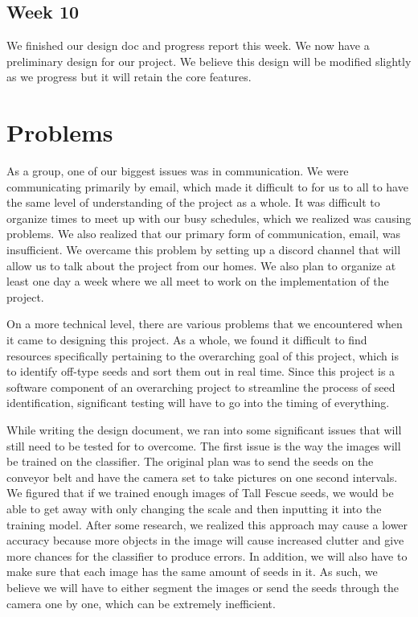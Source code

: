 \documentclass[onecolumn, draftclsnofoot,10pt, compsoc]{IEEEtran}
\begin{document}
	\subsection{Week 10}
	We finished our design doc and progress report this week. We now have a preliminary design for our project. We believe this design will be modified slightly as we progress but it will retain the core features.
	
	\section{Problems}
	
	As a group, one of our biggest issues was in communication. We were communicating primarily by email, which made it difficult to for us to all to have the same level of understanding of the project as a whole. It was difficult to organize times to meet up with our busy schedules, which we realized was causing problems. We also realized that our primary form of communication, email, was insufficient. We overcame this problem by setting up a discord channel that will allow us to talk about the project from our homes. We also plan to organize at least one day a week where we all meet to work on the implementation of the project.
	
	On a more technical level, there are various problems that we encountered when it came to designing this project. As a whole, we found it difficult to find resources specifically pertaining to the overarching goal of this project, which is to identify off-type seeds and sort them out in real time. Since this project is a software component of an overarching project to streamline the process of seed identification, significant testing will have to go into the timing of everything. 
	
	While writing the design document, we ran into some significant issues that will still need to be tested for to overcome. The first issue is the way the images will be trained on the classifier. The original plan was to send the seeds on the conveyor belt and have the camera set to take pictures on one second intervals. We figured that if we trained  enough images of Tall Fescue seeds, we would be able to get away with only changing the scale and then inputting it into the training model. After some research, we realized this approach may cause a lower accuracy because more objects in the image will cause increased clutter and give more chances for the classifier to produce errors. In addition, we will also have to make sure that each image has the same amount of seeds in it. As such, we believe we will have to either segment the images or send the seeds through the camera one by one, which can be extremely inefficient. 
	
\end{document}
